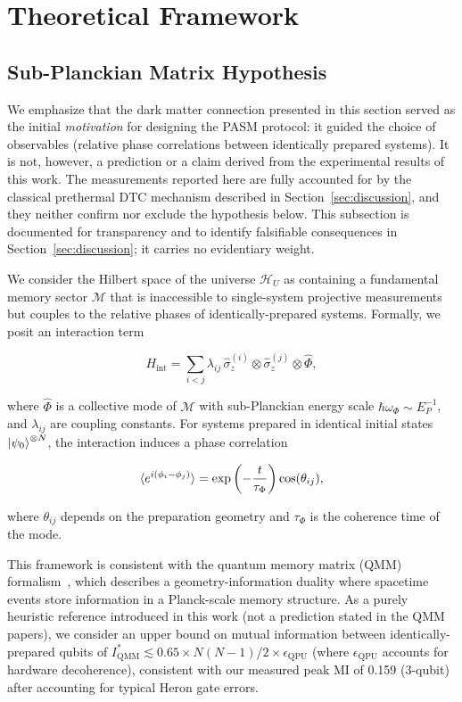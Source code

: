\documentclass[12pt,a4paper]{article}
\begin{document}
\section{Theoretical Framework}
\label{sec:theory}

\subsection{Sub-Planckian Matrix Hypothesis}

We emphasize that the dark matter connection presented in this section served as the initial \textit{motivation} for designing the PASM protocol: it guided the choice of observables (relative phase correlations between identically prepared systems). It is not, however, a prediction or a claim derived from the experimental results of this work. The measurements reported here are fully accounted for by the classical prethermal DTC mechanism described in Section~\ref{sec:discussion}, and they neither confirm nor exclude the hypothesis below. This subsection is documented for transparency and to identify falsifiable consequences in Section~\ref{sec:discussion}; it carries no evidentiary weight.

We consider the Hilbert space of the universe $\mathcal{H}_U$ as containing a fundamental memory sector $\mathcal{M}$ that is inaccessible to single-system projective measurements but couples to the relative phases of identically-prepared systems. Formally, we posit an interaction term

\begin{equation}
H_{\text{int}} = \sum_{i<j} \lambda_{ij} \, \hat{\sigma}^{(i)}_z \otimes \hat{\sigma}^{(j)}_z \otimes \hat{\Phi},
\end{equation}

where $\hat{\Phi}$ is a collective mode of $\mathcal{M}$ with sub-Planckian energy scale $\hbar\omega_\Phi \sim E_P^{-1}$, and $\lambda_{ij}$ are coupling constants. For systems prepared in identical initial states $\ket{\psi_0}^{\otimes N}$, the interaction induces a phase correlation

\begin{equation}
\braket{e^{i(\phi_i - \phi_j)}} = \exp\left(-\frac{t}{\tau_\Phi}\right) \cos(\theta_{ij}),
\end{equation}

where $\theta_{ij}$ depends on the preparation geometry and $\tau_\Phi$ is the coherence time of the mode.

This framework is consistent with the quantum memory matrix (QMM) formalism~\cite{neukart2025}, which describes a geometry-information duality where spacetime events store information in a Planck-scale memory structure. As a purely heuristic reference introduced in this work (not a prediction stated in the QMM papers), we consider an upper bound on mutual information between identically-prepared qubits of $I_{\text{QMM}}^{*} \lesssim 0.65 \times N(N-1)/2 \times \epsilon_{\text{QPU}}$ (where $\epsilon_{\text{QPU}}$ accounts for hardware decoherence), consistent with our measured peak MI of 0.159 (3-qubit) after accounting for typical Heron gate errors.
\end{document}
